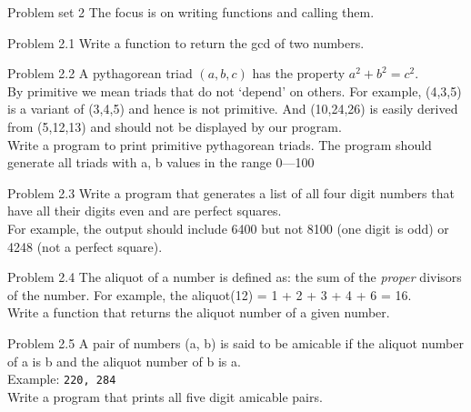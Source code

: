 \documentclass[14pt,compress]{beamer}
\newcounter{time}
\newcommand{\inctime}[1]{\addtocounter{time}{#1}{\tiny \thetime\ m}}
\begin{document}
\begin{frame}{Problem set 2}
  The focus is on writing functions and calling them.
\end{frame}

\begin{frame}{Problem 2.1}
  Write a function to return the gcd of two numbers.
\end{frame}

\begin{frame}{Problem 2.2}
A pythagorean triad $(a,b,c)$ has the property $a^2 + b^2 = c^2$.\\By primitive we mean triads that do not `depend' on others. For example, (4,3,5) is a variant of (3,4,5) and hence is not primitive. And (10,24,26) is easily derived from (5,12,13) and should not be displayed by our program. \\
Write a program to print primitive pythagorean triads. The program should generate all triads with a, b values in the range 0---100
\end{frame}

\begin{frame}{Problem 2.3}
  Write a program that generates a list of all four digit numbers that have all their digits even and are perfect squares.\\For example, the output should include 6400 but not 8100 (one digit is odd) or 4248 (not a perfect square).
\end{frame}

\begin{frame}{Problem 2.4}
  The aliquot of a number is defined as: the sum of the \emph{proper} divisors of the number. For example, the aliquot(12) = 1 + 2 + 3 + 4 + 6 = 16.\\
  Write a function that returns the aliquot number of a given number. 
\end{frame}

\begin{frame}{Problem 2.5}
  A pair of numbers (a, b) is said to be \alert{amicable} if the aliquot number of a is b and the aliquot number of b is a.\\
  Example: \texttt{220, 284}\\
  Write a program that prints all five digit amicable pairs.
  \inctime{30}
\end{frame}

\end{document}
